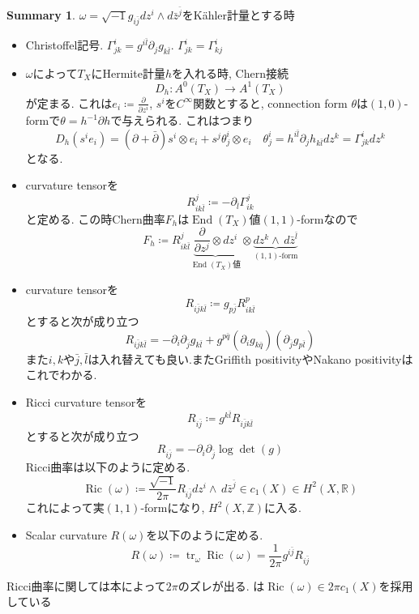 \documentclass[dvipdfmx,a4paper,11pt]{article} %
\theoremstyle{definition}
\newtheorem{suma}[thm]{Summary}
\theoremstyle{remark}
\numberwithin{equation}{section}
\newcommand{\End}[0]{\operatorname{End}}
\DeclareMathOperator{\Ric}{Ric}
\newcommand{\R}{\mathbb{R}}
\newcommand{\Z}{\mathbb{Z}}
\begin{document}
\begin{tcolorbox}[mybox]
\begin{suma}
\label{suma-brief-diff}
$\omega=\sqrt{-1}g_{i \bar{j}} dz^i \wedge d \bar{z}^{\bar{j}}$をK\"ahler計量とする時
\begin{itemize}
\item Christoffel記号. $\Gamma_{jk}^{i} = g^{i\bar{l}} \partial_j g_{k\bar{l}} $. $\Gamma_{jk}^{i} = \Gamma_{kj}^{i}$
\item $\omega$によって$T_X$にHermite計量$h$を入れる時, Chern接続 
\[
D_h \colon A^0(T_X) \to A^{1}(T_X)
\]
が定まる. これは$e_i\coloneqq \frac{\partial}{\partial z^i}$, $s^i$を$C^\infty$関数とすると, connection form $\theta$は$(1,0)$-formで$\theta=h^{-1} \partial h$で与えられる. これはつまり
\[
D_h (s^i e_i) = (\partial + \bar\partial)s^i \otimes e_i + s^j \theta^{i}_{j} \otimes e_i
\quad
\theta^{i}_{j} = h^{i \bar{l}}\partial_j h_{k \bar{l}} dz^k =\Gamma_{jk}^{i} dz^k
\]
となる. 
\item curvature tensorを
\[
R^{j}_{i k \bar{l}}\coloneqq  - \partial_{\bar{l}}\Gamma^{j}_{ik}
\]
と定める. この時Chern曲率$F_h$は$\End(T_X)$値$(1,1)$-formなので
\[
F_h \coloneqq R^{j}_{i k \bar{l}}
\underbrace{\frac{\partial}{\partial z^{j}}\otimes dz^i}_{\text{$\End(T_X)$値}} 
\otimes \underbrace{dz^k \wedge\,d\bar{z}^{\bar{l}}}_{\text{$(1,1)$-form}}
\]
\item curvature tensorを
\[
R_{i \bar{j}k \bar{l}}\coloneqq  g_{p\bar{j}} R^{p}_{i k \bar{l}}
\]とすると次が成り立つ
\begin{equation*}
R_{i \bar{j}k \bar{l}} = -\partial_i \partial_{\bar{j}} g_{k \bar{l}}
+g^{p\bar{q}}(\partial_i g_{k \bar{q}})(\partial_{\bar{j}}g_{p\bar{l}})
\end{equation*}
また$i,k$や$\bar{j}, \bar{l}$は入れ替えても良い.またGriffith positivityやNakano positivityはこれでわかる.
\item Ricci curvature tensorを
\[
R_{i\bar{j}}\coloneqq g^{k \bar{l}}R_{i \bar{j}k \bar{l}} 
\]
とすると次が成り立つ
\[
R_{i \bar{j}} = -\partial_i \partial_{\bar{j}} \log \det(g)
\]
Ricci曲率は以下のように定める. 
\[
\Ric(\omega)\coloneqq  \frac{\sqrt{-1}}{2 \pi} R_{i\bar{j}}dz^i \wedge\,d\bar{z}^{\bar{j}}
\in c_1(X) \in H^{2}(X, \R)
\]
これによって実$(1,1)$-formになり, $H^{2}(X, \Z)$に入る. 
\item Scalar curvature $R(\omega)$を以下のように定める. 
\[
R(\omega)\coloneqq  \operatorname{tr}_{\omega}\Ric(\omega)=
\frac{1}{2 \pi} g^{i\bar{j}}R_{i\bar{j}}
\]
\end{itemize}
\end{suma}
\end{tcolorbox}
Ricci曲率に関しては本によって$2\pi$のズレが出る. 
\cite{Sze14}は$\Ric(\omega) \in 2 \pi c_1(X)$を採用している
\end{document}

